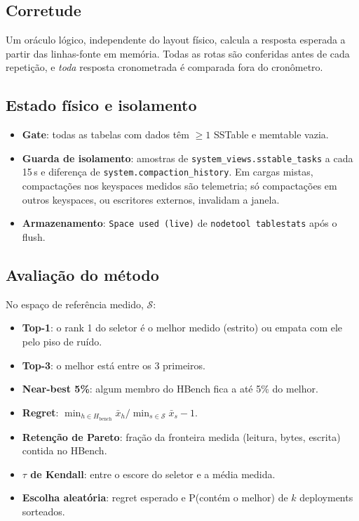 \documentclass[10pt,a4paper,twoside]{article}
\theoremstyle{definition}\newtheorem{definicao}{Definição}
\begin{document}
\subsection{Corretude}
Um oráculo lógico, independente do layout físico, calcula a resposta esperada a partir das linhas-fonte em memória. Todas as rotas são conferidas antes de cada repetição, e \emph{toda} resposta cronometrada é comparada fora do cronômetro.

\subsection{Estado físico e isolamento}
\begin{itemize}
\item \textbf{Gate}: todas as tabelas com dados têm $\geq 1$ SSTable e memtable vazia.
\item \textbf{Guarda de isolamento}: amostras de \texttt{system\_views.sstable\_tasks} a cada 15\,s e diferença de \texttt{system.compaction\_history}. Em cargas mistas, compactações nos keyspaces medidos são telemetria; só compactações em outros keyspaces, ou escritores externos, invalidam a janela.
\item \textbf{Armazenamento}: \texttt{Space used (live)} de \texttt{nodetool tablestats} após o flush.
\end{itemize}

\subsection{Avaliação do método}
No espaço de referência medido, $\mathcal{S}$:
\begin{itemize}
\item \textbf{Top-1}: o rank 1 do seletor é o melhor medido (estrito) ou empata com ele pelo piso de ruído.
\item \textbf{Top-3}: o melhor está entre os 3 primeiros.
\item \textbf{Near-best 5\%}: algum membro do HBench fica a até 5\% do melhor.
\item \textbf{Regret}: $\min_{h\in H_{\text{bench}}} \bar x_h / \min_{s\in\mathcal S}\bar x_s - 1$.
\item \textbf{Retenção de Pareto}: fração da fronteira medida (leitura, bytes, escrita) contida no HBench.
\item \textbf{$\tau$ de Kendall}: entre o escore do seletor e a média medida.
\item \textbf{Escolha aleatória}: regret esperado e P(contém o melhor) de $k$ deployments sorteados.
\end{itemize}
\end{document}
